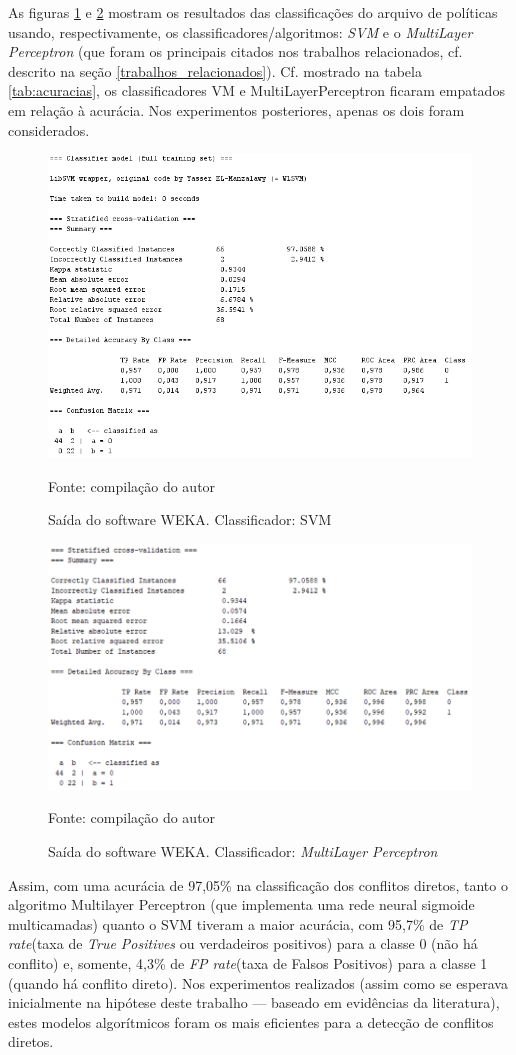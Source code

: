 As figuras \ref{fig:saida_svm} e \ref{fig:saida_multilayerperceptron} mostram os resultados das classificações do arquivo de políticas usando, respectivamente, os classificadores/algoritmos: \textit{SVM} e o \textit{MultiLayer Perceptron} (que foram os principais citados nos trabalhos relacionados, cf. descrito na seção \ref{trabalhos_relacionados}). Cf. mostrado na tabela \ref{tab:acuracias}, os classificadores VM e MultiLayerPerceptron ficaram empatados em relação à acurácia. Nos experimentos posteriores, apenas os dois foram considerados.
\begin{figure}[h!]
	\centering
	\includegraphics[width=.7\textwidth]{imagens/svm-resultados.png}	
	\caption{Saída do software WEKA. Classificador: SVM}
	\label{fig:saida_svm}
	{\scriptsize Fonte: compilação do autor}
\end{figure}
\begin{figure}[h!]
	\centering
	\includegraphics[width=.7\textwidth]{imagens/multilayerperceptron-resultados.png}
	\caption{Saída do software WEKA. Classificador: \textit{MultiLayer Perceptron}}
	\label{fig:saida_multilayerperceptron}
	{\scriptsize Fonte: compilação do autor}
\end{figure}

Assim, com uma acurácia de 97,05\% na classificação dos conflitos diretos, tanto o algoritmo Multilayer Perceptron (que implementa uma rede neural sigmoide multicamadas) quanto o SVM tiveram a maior acurácia, com 95,7\% de \textit{TP rate}(taxa de \textit{True Positives} ou verdadeiros positivos) para a classe 0 (não há conflito) e, somente, 4,3\% de \textit{FP rate}(taxa de Falsos Positivos) para a classe 1 (quando há conflito direto). Nos experimentos realizados (assim como se esperava inicialmente na hipótese deste trabalho --- baseado em evidências da literatura), estes modelos algorítmicos foram os mais eficientes para a detecção de conflitos diretos.

